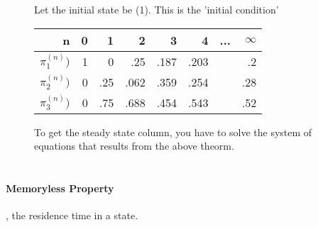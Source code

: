 \begin{figure}[!h]
Let the initial state be (1). This is the 'initial condition'
\begin{tabular}{ r | r  | r  |  r  |  r  |  r  |  r   | r }
	  n & 0 & 1  & 2  & 3  & 4  & ...  & $\infty$ \\
	\hline
	$\pi_1^{(n)})$ & 1 & 0    & .25   & .187  & .203  &  & .2 \\
	$\pi_2^{(n)})$ & 0 & .25  & .062  & .359  & .254  &  & .28 \\
	$\pi_3^{(n)})$ & 0 & .75  & .688  & .454  & .543  &  & .52 \\
\end{tabular}
To get the steady state column, you have to solve the system of equations that
results from the above theorm.
\end{figure}

\begin{equation*} \begin{split}
\end{split} \end{equation*}

\paragraph{Memoryless Property}, the residence time in a state.













